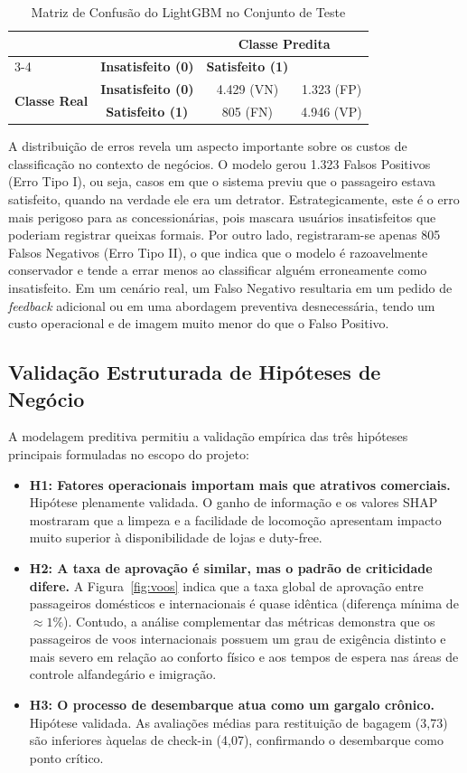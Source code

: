 \documentclass[12pt]{article}
\begin{document}
\begin{table}[ht]
\centering
\caption{Matriz de Confusão do LightGBM no Conjunto de Teste}
\label{tab:confusion_matrix}
\begin{tabular}{|l|c|c|c|}
\hline
\multicolumn{2}{|c|}{} & \multicolumn{2}{c|}{\textbf{Classe Predita}} \\
\cline{3-4}
\multicolumn{2}{|c|}{} & \textbf{Insatisfeito (0)} & \textbf{Satisfeito (1)} \\
\hline
\multirow{2}{*}{\textbf{Classe Real}} & \textbf{Insatisfeito (0)} & 4.429 (VN) & 1.323 (FP) \\
\cline{2-4}
& \textbf{Satisfeito (1)} & 805 (FN) & 4.946 (VP) \\
\hline
\end{tabular}
\end{table}

A distribuição de erros revela um aspecto importante sobre os custos de classificação no contexto de negócios. O modelo gerou 1.323 Falsos Positivos (Erro Tipo I), ou seja, casos em que o sistema previu que o passageiro estava satisfeito, quando na verdade ele era um detrator. Estrategicamente, este é o erro mais perigoso para as concessionárias, pois mascara usuários insatisfeitos que poderiam registrar queixas formais. Por outro lado, registraram-se apenas 805 Falsos Negativos (Erro Tipo II), o que indica que o modelo é razoavelmente conservador e tende a errar menos ao classificar alguém erroneamente como insatisfeito. Em um cenário real, um Falso Negativo resultaria em um pedido de \textit{feedback} adicional ou em uma abordagem preventiva desnecessária, tendo um custo operacional e de imagem muito menor do que o Falso Positivo.

\subsection{Validação Estruturada de Hipóteses de Negócio}
A modelagem preditiva permitiu a validação empírica das três hipóteses principais formuladas no escopo do projeto:
\begin{itemize}
    \item \textbf{H1: Fatores operacionais importam mais que atrativos comerciais.} Hipótese plenamente validada. O ganho de informação e os valores SHAP mostraram que a limpeza e a facilidade de locomoção apresentam impacto muito superior à disponibilidade de lojas e duty-free.
    \item \textbf{H2: A taxa de aprovação é similar, mas o padrão de criticidade difere.} A Figura~\ref{fig:voos} indica que a taxa global de aprovação entre passageiros domésticos e internacionais é quase idêntica (diferença mínima de \(\approx 1\%\)). Contudo, a análise complementar das métricas demonstra que os passageiros de voos internacionais possuem um grau de exigência distinto e mais severo em relação ao conforto físico e aos tempos de espera nas áreas de controle alfandegário e imigração.
    \item \textbf{H3: O processo de desembarque atua como um gargalo crônico.} Hipótese validada. As avaliações médias para restituição de bagagem (3,73) são inferiores àquelas de check-in (4,07), confirmando o desembarque como ponto crítico.
\end{itemize}
\end{document}
